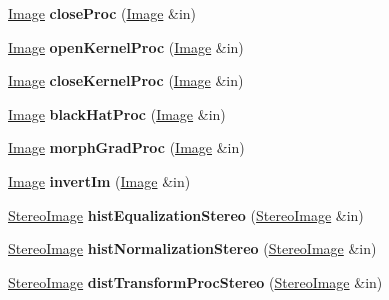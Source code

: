 \begin{DoxyCompactItemize}
\item 
\hyperlink{classImage}{Image} {\bfseries close\+Proc} (\hyperlink{classImage}{Image} \&in)\hypertarget{classMorphOps_aad8386eb84b08dbbdf551803e20045aa}{}\label{classMorphOps_aad8386eb84b08dbbdf551803e20045aa}

\item 
\hyperlink{classImage}{Image} {\bfseries open\+Kernel\+Proc} (\hyperlink{classImage}{Image} \&in)\hypertarget{classMorphOps_a2cc4924131cfe8bd948b74217b5f5d58}{}\label{classMorphOps_a2cc4924131cfe8bd948b74217b5f5d58}

\item 
\hyperlink{classImage}{Image} {\bfseries close\+Kernel\+Proc} (\hyperlink{classImage}{Image} \&in)\hypertarget{classMorphOps_a7315f4fde63c25565a836f9f4154f7f8}{}\label{classMorphOps_a7315f4fde63c25565a836f9f4154f7f8}

\item 
\hyperlink{classImage}{Image} {\bfseries black\+Hat\+Proc} (\hyperlink{classImage}{Image} \&in)\hypertarget{classMorphOps_a76a0d537bbc54fb7b7407f7123dcfd2b}{}\label{classMorphOps_a76a0d537bbc54fb7b7407f7123dcfd2b}

\item 
\hyperlink{classImage}{Image} {\bfseries morph\+Grad\+Proc} (\hyperlink{classImage}{Image} \&in)\hypertarget{classMorphOps_ab798269fc109f69dde88cc65821d5ce4}{}\label{classMorphOps_ab798269fc109f69dde88cc65821d5ce4}

\item 
\hyperlink{classImage}{Image} {\bfseries invert\+Im} (\hyperlink{classImage}{Image} \&in)\hypertarget{classMorphOps_ada9c91424d39e94a7291dd9fa2e5c15b}{}\label{classMorphOps_ada9c91424d39e94a7291dd9fa2e5c15b}

\item 
\hyperlink{classStereoImage}{Stereo\+Image} {\bfseries hist\+Equalization\+Stereo} (\hyperlink{classStereoImage}{Stereo\+Image} \&in)\hypertarget{classMorphOps_a6ebac4745c30ed9b2e33c139fe1c947d}{}\label{classMorphOps_a6ebac4745c30ed9b2e33c139fe1c947d}

\item 
\hyperlink{classStereoImage}{Stereo\+Image} {\bfseries hist\+Normalization\+Stereo} (\hyperlink{classStereoImage}{Stereo\+Image} \&in)\hypertarget{classMorphOps_acdace4d7df6c24f48e88db6b7abdcaa5}{}\label{classMorphOps_acdace4d7df6c24f48e88db6b7abdcaa5}

\item 
\hyperlink{classStereoImage}{Stereo\+Image} {\bfseries dist\+Transform\+Proc\+Stereo} (\hyperlink{classStereoImage}{Stereo\+Image} \&in)\hypertarget{classMorphOps_a07b53aa5e4be0b5e4aa3142a63b874dd}{}\label{classMorphOps_a07b53aa5e4be0b5e4aa3142a63b874dd}


\end{DoxyCompactItemize}
